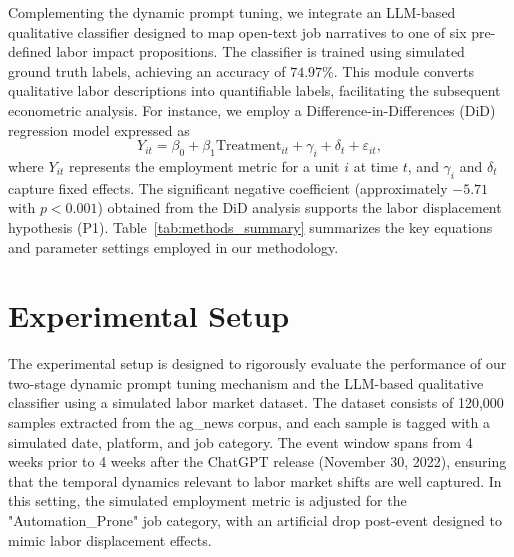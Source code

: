 \documentclass{article} %
\begin{document}
Complementing the dynamic prompt tuning, we integrate an LLM-based qualitative classifier designed to map open-text job narratives to one of six pre-defined labor impact propositions. The classifier is trained using simulated ground truth labels, achieving an accuracy of \(74.97\%\). This module converts qualitative labor descriptions into quantifiable labels, facilitating the subsequent econometric analysis. For instance, we employ a Difference-in-Differences (DiD) regression model expressed as
\[
Y_{it} = \beta_0 + \beta_1 \text{Treatment}_{it} + \gamma_i + \delta_t + \varepsilon_{it},
\]
where \( Y_{it} \) represents the employment metric for a unit \( i \) at time \( t \), and \(\gamma_i\) and \(\delta_t\) capture fixed effects. The significant negative coefficient (approximately \(-5.71\) with \( p < 0.001 \)) obtained from the DiD analysis supports the labor displacement hypothesis (P1). Table~\ref{tab:methods_summary} summarizes the key equations and parameter settings employed in our methodology.

\begin{table}[h]
\centering
{}
\caption{Summary of key equations and parameters in the dynamic prompt tuning and econometric framework.}
\label{tab:methods_summary}
\end{table}

\section{Experimental Setup}
The experimental setup is designed to rigorously evaluate the performance of our two-stage dynamic prompt tuning mechanism and the LLM-based qualitative classifier using a simulated labor market dataset. The dataset consists of 120,000 samples extracted from the ag\_news corpus, and each sample is tagged with a simulated date, platform, and job category. The event window spans from 4 weeks prior to 4 weeks after the ChatGPT release (November 30, 2022), ensuring that the temporal dynamics relevant to labor market shifts are well captured. In this setting, the simulated employment metric is adjusted for the "Automation\_Prone" job category, with an artificial drop post-event designed to mimic labor displacement effects.
\end{document}
